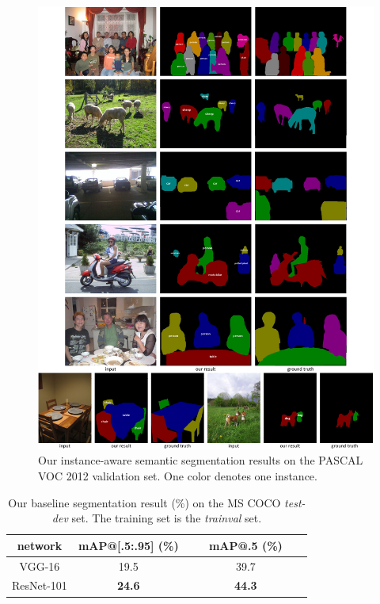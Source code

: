 \documentclass[10pt,twocolumn,letterpaper]{article}
\begin{document}
\begin{figure}
\begin{center}
\includegraphics[width=0.72\linewidth]{figure/voc_results}
\end{center}
\vspace{-1em}
\caption{Our instance-aware semantic segmentation results on the PASCAL VOC 2012 validation set. One color denotes one instance.}
\label{fig:voc_results}
\vspace{-1em}
\end{figure}

\setlength{\tabcolsep}{8pt}
\renewcommand{\arraystretch}{1.05}
\begin{table}[t]
\begin{center}
\small
\begin{tabular}{c|c|c}
network & \footnotesize mAP@[.5:.95] (\%)  & \footnotesize ~~~mAP@.5 (\%)~~~\\
\hline
VGG-16 \cite{Simonyan2015} & 19.5 & 39.7 \\
ResNet-101 \cite{He2015a} & \textbf{24.6} & \textbf{44.3} \\
\end{tabular}	
\end{center}
\vspace{-1em}
\caption{Our baseline segmentation result (\%) on the MS COCO \emph{test-dev} set. The training set is the \emph{trainval} set.}
\label{tab:coco_result}
\end{table}
\end{document}
